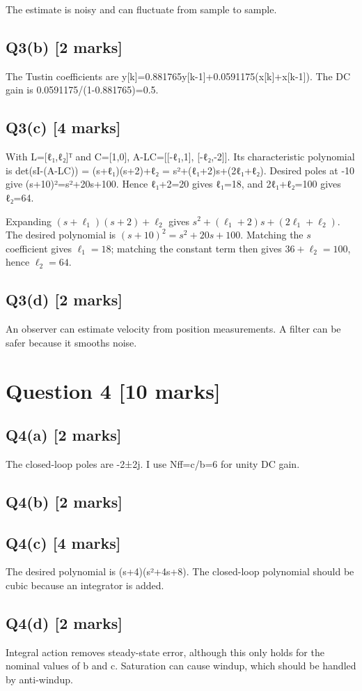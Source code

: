 \documentclass[11pt,a4paper]{article}
\begin{document}
The estimate is noisy and can fluctuate from sample to sample.

\subsection*{Q3(b) \hfill [2 marks]}

The Tustin coefficients are y[k]=0.881765y[k-1]+0.0591175(x[k]+x[k-1]).
The DC gain is 0.0591175/(1-0.881765)=0.5.

\subsection*{Q3(c) \hfill [4 marks]}

With L=[ℓ₁,ℓ₂]ᵀ and C=[1,0], A-LC=[[-ℓ₁,1], [-ℓ₂,-2]].
Its characteristic polynomial is det(sI-(A-LC)) = (s+ℓ₁)(s+2)+ℓ₂ = s²+(ℓ₁+2)s+(2ℓ₁+ℓ₂).
Desired poles at -10 give (s+10)²=s²+20s+100.
Hence ℓ₁+2=20 gives ℓ₁=18, and 2ℓ₁+ℓ₂=100 gives ℓ₂=64.\par\smallskip Expanding $(s+\ell_1)(s+2)+\ell_2$ gives $s^2+(\ell_1+2)s+(2\ell_1+\ell_2)$. The desired polynomial is $(s+10)^2=s^2+20s+100$. Matching the $s$ coefficient gives $\ell_1=18$; matching the constant term then gives $36+\ell_2=100$, hence $\ell_2=64$.

\subsection*{Q3(d) \hfill [2 marks]}

An observer can estimate velocity from position measurements.
A filter can be safer because it smooths noise.

\section*{Question 4 \hfill [10 marks]}
\subsection*{Q4(a) \hfill [2 marks]}

The closed-loop poles are -2±2j.
I use Nff=c/b=6 for unity DC gain.

\subsection*{Q4(b) \hfill [2 marks]}

\vspace{2mm}

\subsection*{Q4(c) \hfill [4 marks]}

The desired polynomial is (s+4)(s²+4s+8).
The closed-loop polynomial should be cubic because an integrator is added.

\subsection*{Q4(d) \hfill [2 marks]}

Integral action removes steady-state error, although this only holds for the nominal values of b and c.
Saturation can cause windup, which should be handled by anti-windup.
\end{document}
